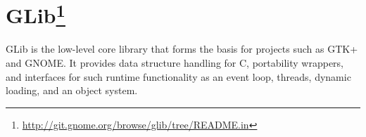 
\section[GLib]{GLib\footnote{\url{http://git.gnome.org/browse/glib/tree/README.in}}}\label{sec:GLib}

GLib is the low-level core library that forms the basis for projects such as GTK+ and GNOME. It provides data structure handling for C, portability wrappers, and interfaces for such runtime functionality as an event loop, threads, dynamic loading, and an object system.

